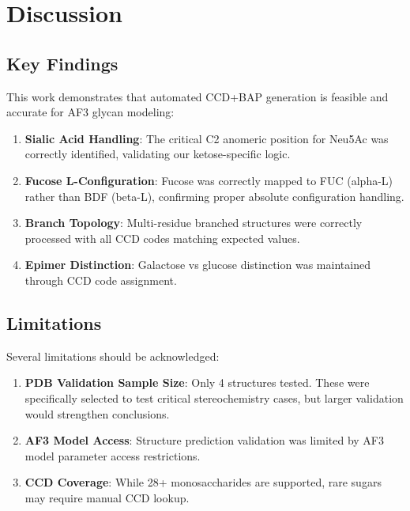 \section{Discussion}

\subsection{Key Findings}

This work demonstrates that automated CCD+BAP generation is feasible and accurate for AF3 glycan modeling:

\begin{enumerate}
\item \textbf{Sialic Acid Handling}: The critical C2 anomeric position for Neu5Ac was correctly identified, validating our ketose-specific logic.

\item \textbf{Fucose L-Configuration}: Fucose was correctly mapped to FUC (alpha-L) rather than BDF (beta-L), confirming proper absolute configuration handling.

\item \textbf{Branch Topology}: Multi-residue branched structures were correctly processed with all CCD codes matching expected values.

\item \textbf{Epimer Distinction}: Galactose vs glucose distinction was maintained through CCD code assignment.
\end{enumerate}

\subsection{Limitations}

Several limitations should be acknowledged:
\begin{enumerate}
\item \textbf{PDB Validation Sample Size}: Only 4 structures tested. These were specifically selected to test critical stereochemistry cases, but larger validation would strengthen conclusions.

\item \textbf{AF3 Model Access}: Structure prediction validation was limited by AF3 model parameter access restrictions.

\item \textbf{CCD Coverage}: While 28+ monosaccharides are supported, rare sugars may require manual CCD lookup.
\end{enumerate}

